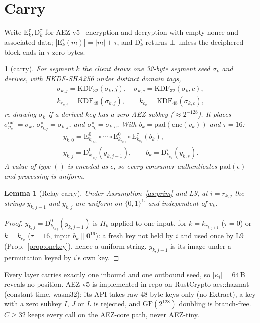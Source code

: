 \documentclass[journal]{IEEEtran}
\newtheorem{lemma}{Lemma}
\newcommand{\namedhead}{}
\newtheorem*{namedenv}{\namedhead}
\newenvironment{defD}[2]{\renewcommand{\namedhead}{Definition #1}%
  \begin{namedenv}[#2]}{\end{namedenv}}
\newcommand{\Enc}[2]{\mathrm{E}^{#1}_{#2}}
\newcommand{\Dec}[2]{\mathrm{D}^{#1}_{#2}}
\newcommand{\pad}{\mathrm{pad}}
\newcommand{\enc}{\mathrm{enc}}
\newcommand{\KDF}{\mathrm{KDF}}
\DeclareRobustCommand{\code}[1]{{\ttfamily\renewcommand{\_}{\textunderscore\allowbreak}#1}}
\begin{document}
\section{Carry}\label{sec:carry}

Write $\Enc{\tau}{k},\Dec{\tau}{k}$ for AEZ v5~\cite{AEZv5,Hoang2015}
encryption and decryption with empty nonce and associated data;
$|\Enc{\tau}{k}(m)|=|m|+\tau$, and $\Dec{\tau}{k}$ returns $\bot$ unless
the deciphered block ends in $\tau$ zero bytes.

\begin{defD}{D7}{carry}
For segment $k$ the client draws one 32-byte segment seed $\sigma_k$ and
derives, with HKDF-SHA256 under distinct domain tags,
\begin{gather*}
\sigma_{k,j}=\KDF_{32}(\sigma_k,j),\quad \sigma_{k,c}=\KDF_{32}(\sigma_k,c),\\
k_{r_{k,j}}=\KDF_{48}(\sigma_{k,j}),\qquad k_{c_k}=\KDF_{48}(\sigma_{k,c}),
\end{gather*}
re-drawing $\sigma_k$ if a derived key has a zero AEZ subkey
($\approx2^{-128}$).  It places $\sigma^{\mathrm{out}}_{p_k}=\sigma_k$,
$\sigma^{\mathrm{in}}_{r_{k,j}}=\sigma_{k,j}$, and
$\sigma^{\mathrm{in}}_{c_k}=\sigma_{k,c}$.
With $b_k=\pad(\enc(v_k))$ and $\tau=16$:
\begin{gather*}
y_{k,0}=\Enc{0}{k_{r_{k,1}}}\circ\cdots\circ\Enc{0}{k_{r_{k,s}}}
\circ\Enc{\tau}{k_{c_k}}(b_k),\\
y_{k,j}=\Dec{0}{k_{r_{k,j}}}(y_{k,j-1}),\qquad
b_k=\Dec{\tau}{k_{c_k}}(y_{k,s}).
\end{gather*}
A value of type $()$ is encoded as $\epsilon$, so every consumer
authenticates $\pad(\epsilon)$ and processing is uniform.
\end{defD}

\begin{lemma}[Relay carry]\label{lem:carry}
Under Assumption~\ref{as:prim} and L9, at $i=r_{k,j}$ the strings
$y_{k,j-1}$ and $y_{k,j}$ are uniform on $\{0,1\}^C$ and independent of
$v_k$.
\end{lemma}
\begin{proof}
$y_{k,j}=\Dec{0}{k_{r_{k,j}}}(y_{k,j-1})$ is $\Pi_k$ applied to one
input, for $k=k_{r_{k,j+1}}$ ($\tau=0$) or $k=k_{c_k}$ ($\tau=16$, input
$b_k\|0^{16}$): a fresh key not held by $i$ and used once by L9
(Prop.~\ref{prop:onekey}), hence a uniform string.  $y_{k,j-1}$ is its
image under a permutation keyed by $i$'s own key.
\end{proof}

Every layer carries exactly one inbound and one outbound seed, so
$|\kappa_i|=64$\,B reveals no position.  AEZ v5 is implemented in-repo on
RustCrypto \code{aes::hazmat} (constant-time, \code{wasm32}); its API takes
raw $48$-byte keys only (no Extract), a key with a zero subkey $I$, $J$ or
$L$ is rejected, and $\mathrm{GF}(2^{128})$ doubling is branch-free.  $C\ge32$ keeps every call on the AEZ-core
path, never AEZ-tiny.
\end{document}
